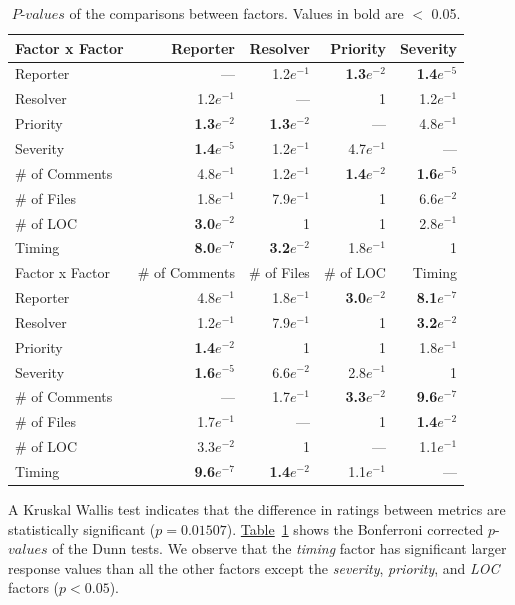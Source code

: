 \begin{sloppypar}
\begin{table}
	\scriptsize
	\centering
	\caption{$P$-$values$ of the comparisons between factors. Values in bold are $<$ 0.05.
		\label{tbl:pvalues_factors}
	}
	\begin{tabular}{lrrrr}
		\hline 
		Factor x Factor & Reporter & Resolver & Priority & Severity\tabularnewline
		\hline 
		\hline 
		Reporter & --- & 1.2$e^{-1}$ & \textbf{1.3$e^{-2}$} & \textbf{1.4$e^{-5}$} \tabularnewline
		\hline 
		Resolver & 1.2$e^{-1}$ & --- & 1 & 1.2$e^{-1}$ \tabularnewline
		\hline 
		Priority & \textbf{1.3$e^{-2}$} & \textbf{1.3$e^{-2}$} & --- & 4.8$e^{-1}$ \tabularnewline
		\hline 
		Severity & \textbf{1.4$e^{-5}$} & 1.2$e^{-1}$ & 4.7$e^{-1}$ & ---\tabularnewline
		\hline 
		\# of Comments & 4.8$e^{-1}$ & 1.2$e^{-1}$ & \textbf{1.4$e^{-2}$} & \textbf{1.6$e^{-5}$} \tabularnewline
		\hline 
		\# of Files & 1.8$e^{-1}$ & 7.9$e^{-1}$ & 1 & 6.6$e^{-2}$ \tabularnewline
		\hline 
		\# of LOC & \textbf{3.0$e^{-2}$} & 1 & 1 & 2.8$e^{-1}$ \tabularnewline
		\hline 
		Timing & \textbf{8.0$e^{-7}$} & \textbf{3.2$e^{-2}$} & 1.8$e^{-1}$ & 1\tabularnewline
		\hline 
		\hline
		Factor x Factor & \# of Comments & \# of Files & \# of LOC & Timing\tabularnewline
		\hline 
		Reporter & 4.8$e^{-1}$ & 1.8$e^{-1}$ & \textbf{3.0$e^{-2}$} & \textbf{8.1$e^{-7}$} \tabularnewline
		\hline 
		Resolver & 1.2$e^{-1}$ & 7.9$e^{-1}$ & 1 & \textbf{3.2$e^{-2}$} \tabularnewline
		\hline 
		Priority & \textbf{1.4$e^{-2}$} & 1 & 1 & 1.8$e^{-1}$ \tabularnewline
		\hline 
		Severity & \textbf{1.6$e^{-5}$} & 6.6$e^{-2}$ & 2.8$e^{-1}$ & 1\tabularnewline
		\hline 
		\# of Comments & --- & 1.7$e^{-1}$ & \textbf{3.3$e^{-2}$} & \textbf{9.6$e^{-7}$} \tabularnewline
		\hline 
		\# of Files & 1.7$e^{-1}$ & --- & 1 & \textbf{1.4$e^{-2}$} \tabularnewline
		\hline 
		\# of LOC & 3.3$e^{-2}$ & 1 & --- & 1.1$e^{-1}$ \tabularnewline
		\hline 
		Timing & \textbf{9.6$e^{-7}$} & \textbf{1.4$e^{-2}$} & 1.1$e^{-1}$ & ---\tabularnewline
		\hline 
	\end{tabular}
\end{table}

A Kruskal Wallis test indicates that the difference in ratings between metrics
are statistically significant ($p=0.01507$).
\hyperref[tbl:pvalues_factors]{Table}~\ref{tbl:pvalues_factors} shows the
Bonferroni corrected $p$-$values$ of the Dunn tests. We observe that the {\em
timing} factor has significant larger response values than all the other factors except
the {\em severity}, {\em priority}, and {\em LOC} factors ($p<0.05$).


\end{sloppypar}
